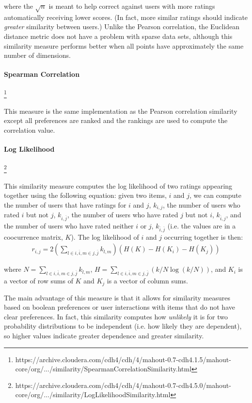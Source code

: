 \documentclass{article}
\begin{document}
where the $\sqrt{n}$ is meant to help correct against users with more ratings automatically receiving lower scores. 
(In fact, more similar ratings should indicate \emph{greater} similarity between users.) Unlike the Pearson correlation,
the Euclidean distance metric does not have a problem with sparse data sets, although this similarity measure 
performs better when all points have approximately the same number of dimensions. 

\paragraph{Spearman Correlation}\footnote{https://archive.cloudera.com/cdh4/cdh/4/mahout-0.7-cdh4.1.5/mahout-core/org/.../similarity/SpearmanCorrelationSimilarity.html}

This measure is the same implementation as the Pearson correlation similarity except all preferences are ranked and the 
rankings are used to compute the correlation value.

\paragraph{Log Likelihood}\footnote{https://archive.cloudera.com/cdh4/cdh/4/mahout-0.7-cdh4.5.0/mahout-core/org/.../similarity/LogLikelihoodSimilarity.html}

This similarity measure computes the log likelihood of two ratings appearing together using the following equation: given two items, $i$ and $j$, we can compute the number of users that have ratings for $i$ and $j$, $k_{i,j}$, the number of users
who rated $i$ but not $j$, $k_{i,\overline{j}}$, the number of users who have rated $j$ but
not $i$, $k_{\overline{i}, j}$, and the number of users who have rated neither $i$ or $j$, 
$k_{\overline{i}, \overline{j}}$ (i.e. the values are in a coocurrence matrix, $K$). 
The log likelihood of $i$ and $j$ occurring together is
then:\begin{align*}
r_{i, j} = 2 \left(\sum_{l \in {i, \overline{i}}, m \in {j, \overline{j}}} k_{l, m} \right)(H(K) - H(K_i) - H(K_j))
\end{align*}

where $N = \sum_{l \in {i, \overline{i}}, m \in {j, \overline{j}}} k_{l, m}$, $H = \sum_{l \in {i, \overline{i}}, m \in {j, \overline{j}}}\left(k/N \log(k/N)\right)$, and $K_i$ is a vector of row sums of $K$ and $K_j$ is a vector of column sums. 

The main advantage of this measure is that it allows for similarity measures based on boolean preferences or user
interactions with items that do not have clear preferences. In fact, this similarity computes how \emph{unlikely} it is
for two probability distributions to be independent (i.e. how likely they are dependent), so higher values indicate 
greater dependence and greater similarity.
\end{document}
